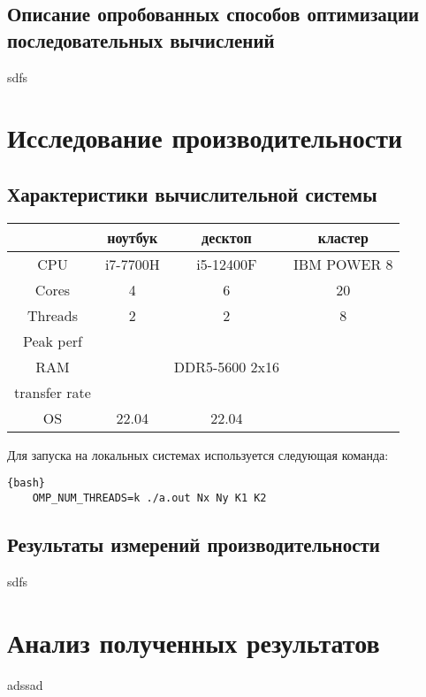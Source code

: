 \documentclass[12pt, a4paper]{article}
\begin{document}
\subsection{Описание опробованных способов оптимизации последовательных вычислений}

sdfs

\newpage

\section{Исследование производительности}

\subsection{Характеристики вычислительной системы}

\begin{center}
	\begin{tabular}{ c|c|c|c| } 
		 & ноутбук & десктоп & кластер \\ 
		\hline
		CPU & i7-7700H & i5-12400F & IBM POWER 8 \\ 
		Cores & 4 & 6 & 20 \\ 
		Threads & 2 & 2 & 8 \\
		Peak perf &  &  &  \\
		RAM &  & DDR5-5600 2x16 &  \\
		transfer rate &  &  &  \\
		OS & 22.04 & 22.04  &  \\
	\end{tabular}
\end{center}

\lstset{style=mystyle}

Для запуска на локальных системах используется следующая команда:

\begin{lstlisting}{bash}
	OMP_NUM_THREADS=k ./a.out Nx Ny K1 K2
\end{lstlisting}

\subsection{Результаты измерений производительности}

sdfs

\newpage

\section{Анализ полученных результатов}

adssad
\end{document}
